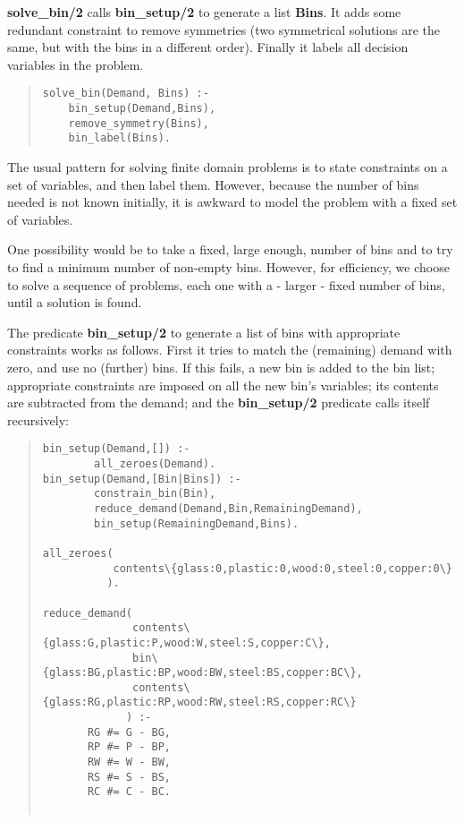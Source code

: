 {\bf solve_bin/2}  calls {\bf bin\_setup/2} to
generate a list {\bf Bins}.
It adds some redundant constraint to remove symmetries (two
symmetrical solutions are
the same, but with the bins in a different order).
Finally it labels all decision variables in the problem.
\begin{quote}
\begin{verbatim}
solve_bin(Demand, Bins) :-
    bin_setup(Demand,Bins),
    remove_symmetry(Bins),
    bin_label(Bins).
\end{verbatim}
\end{quote}

The usual pattern for solving finite domain problems is to state
constraints on a set of variables, and then label them.
However, because the number of bins needed is not known initially, it
is awkward to model the problem with a fixed set of variables.

One possibility would be to take a fixed, large enough, number of bins
and to try to find a minimum number of non-empty bins.
However, for efficiency, we choose to solve a sequence of problems,
each one with a - larger - fixed number of bins,
until a solution is found.

The predicate {\bf bin_setup/2} to generate a list of bins with appropriate
constraints works as follows.
First it tries to match the (remaining) demand with zero,
and use no (further) bins.
If this fails, a new bin is added to the bin list;
appropriate constraints are imposed on all the new bin's
variables;
its contents are subtracted from the demand;
and the {\bf bin_setup/2} predicate calls itself recursively:

\begin{quote}
\begin{verbatim}
bin_setup(Demand,[]) :- 
        all_zeroes(Demand).
bin_setup(Demand,[Bin|Bins]) :-
        constrain_bin(Bin),
        reduce_demand(Demand,Bin,RemainingDemand),
        bin_setup(RemainingDemand,Bins).

all_zeroes( 
           contents\{glass:0,plastic:0,wood:0,steel:0,copper:0\}
          ).

reduce_demand( 
              contents\{glass:G,plastic:P,wood:W,steel:S,copper:C\},
              bin\{glass:BG,plastic:BP,wood:BW,steel:BS,copper:BC\},
              contents\{glass:RG,plastic:RP,wood:RW,steel:RS,copper:RC\} 
             ) :-
       RG #= G - BG,
       RP #= P - BP,
       RW #= W - BW,
       RS #= S - BS,
       RC #= C - BC.
			
\end{verbatim}
\end{quote}

